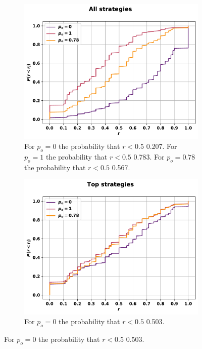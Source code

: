 \begin{figure}[!htbp]
    \begin{subfigure}{.45\textwidth}
    \includegraphics[width=\textwidth]{src/chapters/07/img/cfd_to_probability_all_strategies.pdf}
    \caption{For \(p_o=0\) the probability that \(r<0.5\) 0.207.
    For \(p_o=1\) the probability that \(r<0.5\) 0.783.
    For \(p_o=0.78\) the probability that \(r<0.5\) 0.567.}
    \end{subfigure}\hfill
    \begin{subfigure}{.45\textwidth}
    \includegraphics[width=\textwidth]{src/chapters/07/img/cfd_to_probability_top_strategies.pdf}
    \caption{For \(p_o=0\) the probability that \(r<0.5\) 0.503.
}
\end{subfigure}
\end{figure}
